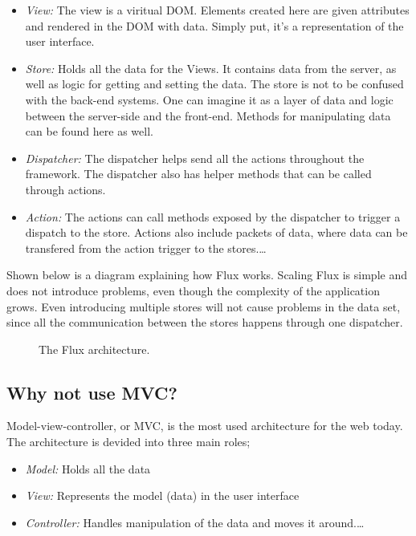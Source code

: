 \begin{itemize}  
\item \emph{View:} The view is a viritual DOM. Elements created here are given attributes and rendered in the DOM with data. Simply put, it's a representation of the user interface.
\item \emph{Store:} Holds all the data for the Views. It contains data from the server, as well as logic for getting and setting the data. The store is not to be confused with the back-end systems. One can imagine it as a layer of data and logic between the server-side and the front-end. Methods for manipulating data can be found here as well.
\item \emph{Dispatcher:} The dispatcher helps send all the actions throughout the framework. The dispatcher also has helper methods that can be called through actions.
\item \emph{Action:} The actions can call methods exposed by the dispatcher to trigger a dispatch to the store. Actions also include packets of data, where data can be transfered from the action trigger to the stores.\ldots 
\end{itemize}

Shown below is a diagram explaining how Flux works. Scaling Flux is simple and does not introduce problems, even though the complexity of the application grows. Even introducing multiple stores will not cause problems in the data set, since all the communication between the stores happens through one dispatcher.

\begin{figure}[h]
\centering
\scalebox{0.8}{{}}
\caption{The Flux architecture.}
\end{figure}




\subsection{Why not use MVC?}

Model-view-controller, or MVC, is the most used architecture for the web today. The architecture is devided into three main roles;
\begin{itemize}  
\item \emph{Model:} Holds all the data
\item \emph{View:} Represents the model (data) in the user interface
\item \emph{Controller:} Handles manipulation of the data and moves it around.\ldots 
\end{itemize}

